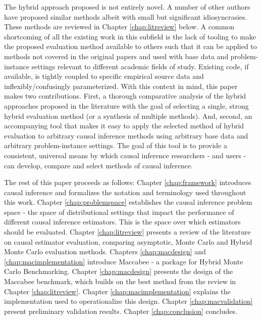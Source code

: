 \documentclass[../main.tex]{subfiles}
\begin{document}
\vspace{\baselineskip}
The hybrid approach proposed is not entirely novel. A number of other authors have proposed similar methods albeit with small but significant idiosyncrasies. These methods are reviewed in Chapter \ref{chap:litreview} below. A common shortcoming of all the existing work in this subfield is the lack of tooling to make the proposed evaluation method available to others such that it can be applied to methods not covered in the original papers and used with base data and problem-instance settings relevant to different academic fields of study. Existing code, if available, is tightly coupled to specific empirical source data and inflexibly/confusingly parameterized. With this context in mind, this paper makes two contributions. First, a thorough comparative analysis of the hybrid approaches proposed in the literature with the goal of selecting a single, strong hybrid evaluation method (or a synthesis of multiple methods). And, second, an accompanying tool that makes it easy to apply the selected method of hybrid evaluation to arbitrary causal inference methods using arbitrary base data and arbitrary problem-instance settings. The goal of this tool is to provide a consistent, universal means by which causal inference researchers - and users - can develop, compare and select methods of causal inference.\par


\vspace{\baselineskip}
The rest of this paper proceeds as follows: Chapter \ref{chap:framework} introduces causal inference and formalizes the notation and terminology used throughout this work. Chapter \ref{chap:problemspace} establishes the causal inference problem space - the space of distributional settings that impact the performance of different causal inference estimators. This is the space over which estimators should be evaluated. Chapter \ref{chap:litreview} presents a review of the literature on causal estimator evaluation, comparing asymptotic, Monte Carlo and Hybrid Monte Carlo evaluation methods. Chapters \ref{chap:macdesign} and \ref{chap:macimplementation} introduce Maccabee - a package for Hybrid Monte Carlo Benchmarking. Chapter \ref{chap:macdesign} presents the design of the Maccabee benchmark, which builds on the best method from the review in Chapter \ref{chap:litreview}. Chapter \ref{chap:macimplementation} explains the implementation used to operationalize this design. Chapter \ref{chap:macvalidation} present preliminary validation results. Chapter \ref{chap:conclusion} concludes.\par
\end{document}
